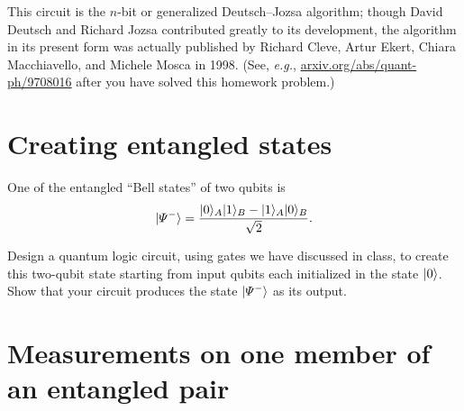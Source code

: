 \documentclass{../phys084}
\begin{document}
\begin{exercise}
\begin{problems}
    This circuit is the \(n\)-bit or generalized Deutsch--Jozsa
    algorithm; though David Deutsch and Richard Jozsa contributed
    greatly to its development, the algorithm in its present form was
    actually published by Richard Cleve, Artur Ekert, Chiara
    Macchiavello, and Michele Mosca in 1998. (See, \textit{e.g.},
    \url{arxiv.org/abs/quant-ph/9708016} after you have solved this
    homework problem.)
  \end{problems}
\end{exercise}

\begin{solution}
  \begin{problems}
  \item
  \item
  \item
  \end{problems}
\end{solution}

\section{Creating entangled states}

\begin{exercise}
  One of the entangled ``Bell states'' of two qubits is
  \[
    \lvert\Psi^-\rangle
    = \frac{\lvert0\rangle_A \lvert1\rangle_B - \lvert1\rangle_A \lvert0\rangle_B}{\sqrt 2}.
  \]

  Design a quantum logic circuit, using gates we have discussed in
  class, to create this two-qubit state starting from input qubits
  each initialized in the state \(\lvert0\rangle\).  Show that your circuit
  produces the state \(\lvert\Psi^-\rangle\) as its output.
\end{exercise}

\begin{solution}
\end{solution}

\section{Measurements on one member of an entangled pair}
\end{document}
